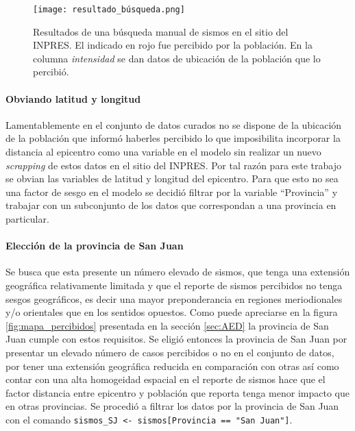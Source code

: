 \documentclass[a4paper]{report}
\begin{document}
\begin{figure}[h]
\centering
\texttt{[image: resultado\_búsqueda.png]}
\caption{Resultados de una búsqueda manual de sismos en el sitio del INPRES. El indicado en rojo fue percibido por la población. En la columna \emph{intensidad} se dan datos de ubicación de la población que lo percibió.}
\label{fig:resultado_búsqueda}
\end{figure}


\paragraph{Obviando latitud y longitud}
Lamentablemente en el conjunto de datos curados no se dispone de la ubicación de la población que informó haberles percibido lo que imposibilita incorporar la distancia al epicentro como una variable en el modelo sin realizar un nuevo \emph{scrapping} de estos datos en el sitio del INPRES.
Por tal razón para este trabajo se obvian las variables de latitud y longitud del epicentro.
Para que esto no sea una factor de sesgo en el modelo se decidió filtrar por la variable ``Provincia'' y trabajar con un subconjunto de los datos que correspondan a una provincia en particular.


\paragraph{Elección de la provincia de San Juan}
Se busca que esta presente un número elevado de sismos, que tenga una extensión geográfica relativamente limitada y que el reporte de sismos percibidos no tenga sesgos geográficos, es decir una mayor preponderancia en regiones meriodionales y/o orientales que en los sentidos opuestos.
Como puede apreciarse en la figura \ref{fig:mapa_percibidos} presentada en la sección \ref{sec:AED} la provincia de San Juan cumple con estos requisitos.
Se eligió entonces la provincia de San Juan por presentar un elevado número de casos percibidos o no en el conjunto de datos, por tener una extensión geográfica reducida en comparación con otras así como contar con una alta homogeidad espacial en el reporte de sismos hace que el factor distancia entre epicentro y población que reporta tenga menor impacto que en otras provincias.
Se procedió a filtrar los datos por la provincia de San Juan con el comando \verb'sismos_SJ <- sismos[Provincia == "San Juan"]'.
\end{document}
